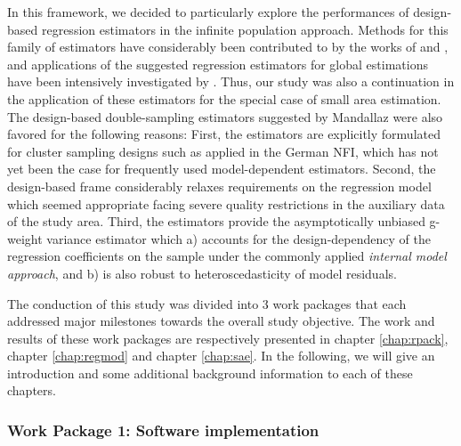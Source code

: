 In this framework, we decided to particularly explore the performances of design-based regression estimators in the infinite population approach. Methods for this family of estimators have considerably been contributed to by the works of \citet{mandallaz2008, mandallaz2013a, mandallaz2013c} and \citet{mandallaz2013b}, and applications of the suggested regression estimators for global estimations have been intensively investigated by \citet{massey2015_thesis}. Thus, our study was also a continuation in the application of these estimators for the special case of small area estimation. The design-based double-sampling estimators suggested by Mandallaz were also favored for the following reasons: First, the estimators are explicitly formulated for cluster sampling designs such as applied in the German NFI, which has not yet been the case for frequently used model-dependent estimators. Second, the design-based frame considerably relaxes requirements on the regression model which seemed appropriate facing severe quality restrictions in the auxiliary data of the study area. Third, the estimators provide the asymptotically unbiased g-weight variance estimator which a) accounts for the design-dependency of the regression coefficients on the sample under the commonly applied \textit{internal model approach}, and b) is also robust to heteroscedasticity of model residuals.\par

The conduction of this study was divided into 3 work packages that each addressed major milestones towards the overall study objective. The work and results of these work packages are respectively presented in chapter \ref{chap:rpack}, chapter \ref{chap:regmod} and chapter \ref{chap:sae}. In the following, we will give an introduction and some additional background information to each of these chapters.


\subsubsection{Work Package 1: Software implementation} %


